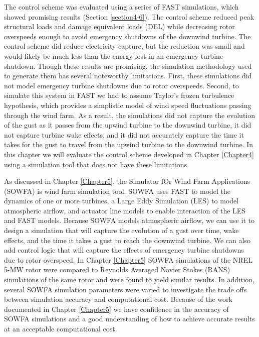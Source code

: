 The control scheme was evaluated using a series of FAST simulations, which showed promising results (Section \ref{section4-6}). The control scheme reduced peak structural loads and damage equivalent loads (DEL) while decreasing rotor overspeeds enough to avoid emergency shutdowns of the downwind turbine. The control scheme did reduce electricity capture, but the reduction was small and would likely be much less than the energy lost in an emergency turbine shutdown. Though these results are promising, the simulation methodology used to generate them has several noteworthy limitations. First, these simulations did not model emergency turbine shutdowns due to rotor overspeeds. Second, to simulate this system in FAST we had to assume Taylor's frozen turbulence hypothesis, which provides a simplistic model of wind speed fluctuations passing through the wind farm. As a result, the simulations did not capture the evolution of the gust as it passes from the upwind turbine to the downwind turbine, it did not capture turbine wake effects, and it did not accurately capture the time it takes for the gust to travel from the upwind turbine to the downwind turbine. In this chapter we will evaluate the control scheme developed in Chapter \ref{Chapter4} using a simulation tool that does not have these limitations.

As discussed in Chapter \ref{Chapter5}, the Simulator fOr Wind Farm Applications (SOWFA) is  wind farm simulation tool. SOWFA uses FAST to model the dynamics of one or more turbines, a Large Eddy Simulation (LES) to model atmospheric airflow, and actuator line models to enable interaction of the LES and FAST models. Because SOWFA models atmospheric airflow, we can use it to design a simulation that will capture the evolution of a gust over time, wake effects, and the time it takes a gust to reach the downwind turbine. We can also add control logic that will capture the effects of emergency turbine shutdowns due to rotor overspeed. In Chapter \ref{Chapter5} SOWFA simulations of the NREL 5-MW rotor were compared to Reynolds Averaged Navier Stokes (RANS) simulations of the same rotor and were found to yield similar results. In addition, several SOWFA simulation parameters were varied to investigate the trade offs between simulation accuracy and computational cost. Because of the work documented in Chapter \ref{Chapter5} we have confidence in the accuracy of SOWFA simulations and a good understanding of how to achieve accurate results at an acceptable computational cost.

